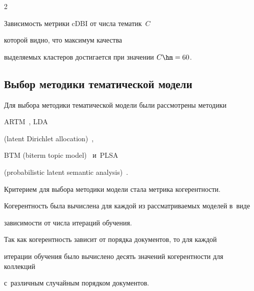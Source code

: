 \begin{multicols}{2}
{\begin{center}
{{Зависимость метрики $\mathrm{cDBI}$ от числа тематик~$C$


}}




\end{center}}










\columnbreak





\noindent


     которой видно, что максимум качества 


выделяемых кластеров достигается при значении $C \hm= 60$.





    \subsection{Выбор методики тематической модели}


    


    Для выбора методики тематической модели были рассмотрены методики 


    ARTM~\cite{vorontsov2015additive}, LDA


    (latent Dirichlet allocation)~\cite{blei2003latent}, 


    BTM (biterm topic model)~\cite{cheng2014btm} и~PLSA


    (probabilistic latent semantic analysis)~\cite{hofmann1999probabilistic}.


    Критерием для выбора методики модели стала метрика ко\-ге\-рент\-ности.


    Ко\-ге\-рент\-ность была вы\-чис\-ле\-на для каждой из рас\-смат\-ри\-ва\-емых моделей в~виде 


зависимости от числа итераций обучения.


    Так как когерентность зависит от порядка документов, то для каждой 


итерации обучения было вычислено десять значений когерентности для коллекций 


с~различным случайным порядком документов.



\end{multicols}
